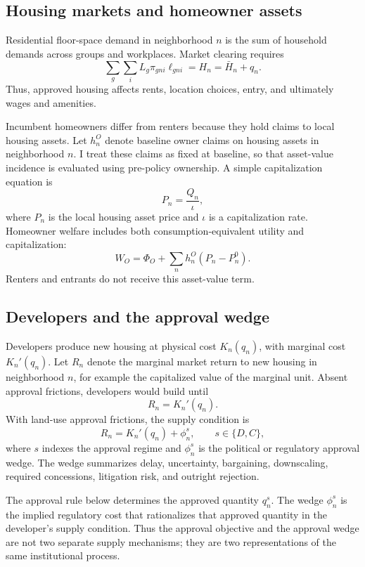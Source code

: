 \subsection{Housing markets and homeowner assets}

Residential floor-space demand in neighborhood \(n\) is the sum of household demands across groups and workplaces.
Market clearing requires
\[
    \sum_g \sum_i L_g \pi_{gni}\ell_{gni}
    =
    H_n
    =
    \bar H_n+q_n.
\]
Thus, approved housing affects rents, location choices, entry, and ultimately wages and amenities.

Incumbent homeowners differ from renters because they hold claims to local housing assets.
Let \(h_n^O\) denote baseline owner claims on housing assets in neighborhood \(n\).
I treat these claims as fixed at baseline, so that asset-value incidence is evaluated using pre-policy ownership.
A simple capitalization equation is
\[
    P_n = \frac{Q_n}{\iota},
\]
where \(P_n\) is the local housing asset price and \(\iota\) is a capitalization rate.
Homeowner welfare includes both consumption-equivalent utility and capitalization:
\[
    W_O
    =
    \Phi_O
    +
    \sum_n h_n^O(P_n-P_n^0).
\]
Renters and entrants do not receive this asset-value term.

\subsection{Developers and the approval wedge}

Developers produce new housing at physical cost \(K_n(q_n)\), with marginal cost \(K_n'(q_n)\).
Let \(R_n\) denote the marginal market return to new housing in neighborhood \(n\), for example the capitalized value of the marginal unit.
Absent approval frictions, developers would build until
\[
    R_n=K_n'(q_n).
\]
With land-use approval frictions, the supply condition is
\[
    R_n=K_n'(q_n)+\phi_n^s,
    \qquad s\in\{D,C\},
\]
where \(s\) indexes the approval regime and \(\phi_n^s\) is the political or regulatory approval wedge.
The wedge summarizes delay, uncertainty, bargaining, downscaling, required concessions, litigation risk, and outright rejection.

The approval rule below determines the approved quantity \(q_n^s\).
The wedge \(\phi_n^s\) is the implied regulatory cost that rationalizes that approved quantity in the developer's supply condition.
Thus the approval objective and the approval wedge are not two separate supply mechanisms; they are two representations of the same institutional process.

